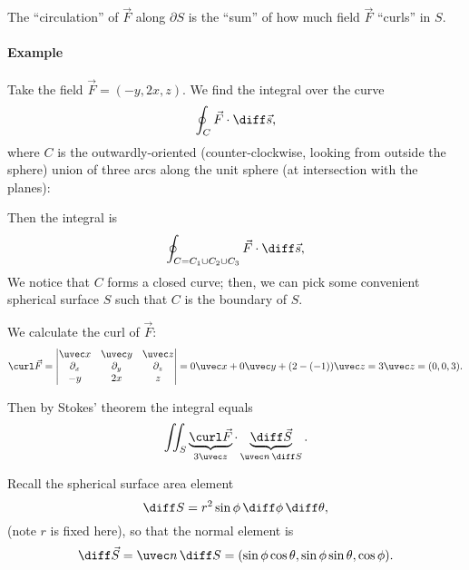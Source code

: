 \documentclass{multi}
\begin{document}
The ``circulation'' of \(\vec F\) along \(\partial S\) is the ``sum'' of how much field \(\vec F\) ``curls'' in \(S\).

\paragraph{Example}

Take the field \(\vec F = (-y, 2x, z)\). We find the integral over the curve 
\[
    \oint_C \vec F \cdot \diff \vec s,
\]
where \(C\) is the outwardly-oriented (counter-clockwise, looking from outside the sphere) union of three arcs along the unit sphere (at intersection with the planes):

Then the integral is
\[
    \oint_{C = C_1 \cup C_2 \cup C_3} \vec F \cdot \diff \vec s,
\]
We notice that \(C\) forms a closed curve; then, we can pick some convenient spherical surface \(S\) such that \(C\) is the boundary of \(S\). 

We calculate the curl of \(\vec F\):
\[
    \curl \vec F = 
    \begin{vmatrix}
        \uvec x & \uvec y & \uvec z \\
        \partial_x & \partial_y & \partial_z \\
        -y & 2x & z
    \end{vmatrix}
    =
    0 \uvec x + 0 \uvec y + (2 - (-1)) \uvec z
    = 3 \uvec z
    = (0, 0, 3).
\]

Then by Stokes' theorem the integral equals
\[
    \iint_S \underbrace{\curl \vec F}_{3 \uvec z} \cdot \underbrace{\diff \vec S}_{\uvec n \, \diff S}.
\]

Recall the spherical surface area element
\[
    \diff S = r^2 \sin \phi \, \diff \phi \, \diff \theta,
\]
(note \(r\) is fixed here), so that the normal element is
\[
    \diff \vec S = \uvec n \, \diff S = (\sin\phi \cos\theta, \sin \phi \sin \theta, \cos \phi).
\]
\end{document}
